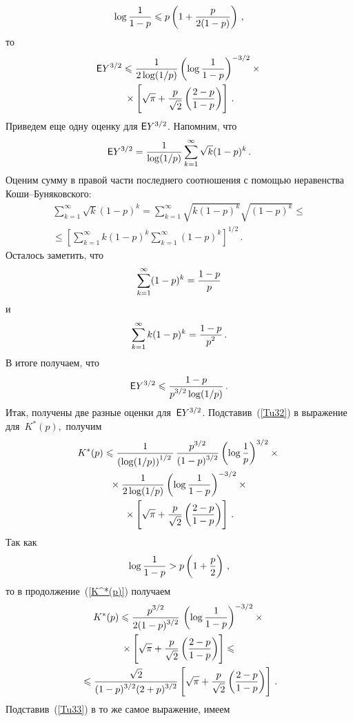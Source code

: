 \begin{multicols}{2}
\noindent
$$
\log\displaystyle\frac{\displaystyle 1\mathstrut}{\displaystyle 1-p\mathstrut} \leqslant  p\left(1+\displaystyle\frac{\displaystyle p\mathstrut}{\displaystyle 2(1-p)\mathstrut}\right)\,,
$$
то
\begin{multline}
 \e Y^{3/2} \leqslant
\fr{1}{2\log({1}/{p})}\left(\log\fr{1}{1-p}\right)^{-3/2}\times{}\\
{}\times
\left[\sqrt{\pi}+\fr{p}{\sqrt{2}}
\left(\fr{2-p}{1-p}\right)\right]\,.
\label{Tu32}
\end{multline}
Приведем еще одну оценку для ${\sf E} Y^{3/2}$. Напомним, что
$$
{\sf E} Y^{3/2}=\displaystyle\frac{\displaystyle 1\mathstrut}{\displaystyle \log({1}/{p})\mathstrut}\sum\limits_{k=1}^\infty \sqrt{k}
(1-p)^k\,.
$$
Оценим сумму в правой части последнего соотношения с помощью
неравенства Коши--Бу\-ня\-ков\-ского:
\begin{multline*}
\sum\limits_{k=1}^\infty \sqrt{k} (1-p)^k =
\sum\limits_{k=1}^\infty \sqrt{k(1-p)^k} \sqrt{(1-p)^k} \leqslant{}\\
{}\leqslant
\left[\sum\limits_{k=1}^\infty k (1-p)^k \sum\limits_{k=1}^\infty
(1-p)^k\right]^{1/2}\,.
\end{multline*}
Осталось заметить, что
$$
\sum\limits_{k=1}^\infty (1-p)^k = \displaystyle\frac{\displaystyle 1-p\mathstrut}{\displaystyle p\mathstrut}
$$
и
$$
\sum\limits_{k=1}^\infty k (1-p)^k = \displaystyle\frac{\displaystyle 1-p\mathstrut}{\displaystyle p^2\mathstrut}\,.
$$
В итоге получаем, что
\begin{equation}
 \e Y^{3/2}\leqslant \fr{1-p}{p^{3/2}\log(1/p)}\,.
 \label{Tu33}
\end{equation}
Итак, получены две разные оценки для~${\sf E} Y^{3/2}$. Подставив~(\ref{Tu32}) в выражение для~$K^*(p),$ получим
\begin{multline}
K^*(p) \leqslant  \fr{1}{\left(\log(1/p)\right)^{1/2}} \,
\fr{p^{3/2}}{(1-p)^{3/2}}\left(\log\fr{1}{p}\right)^{3/2} \times{}
\\
{}
\times\fr{1}{2\log({1}/{p})}
\left(\log\fr{1}{1-p}\right)^{-3/2}\times{}\\
{}\times \left[\sqrt{\pi}+\fr{p}{\sqrt{2}}\left(\fr{2-p}{1-p}\right)\right]\,.
\label{K^*(p)}
\end{multline}
Так как
$$
\log{\displaystyle\frac{\displaystyle 1\mathstrut}{\displaystyle 1-p\mathstrut}} > p\left(1+\displaystyle\frac{\displaystyle p\mathstrut}{\displaystyle 2\mathstrut}\right)\,,
$$
то в продолжение~(\ref{K^*(p)}) получаем
\begin{multline}
K^*(p)\leqslant \fr{p^{3/2}}{2(1-p)^{3/2}} \,
\left(\log\fr{1}{1-p}\right)^{-3/2}\times{}\\
{}\times
\left[
\sqrt{\pi}+\fr{p}{\sqrt{2}}\left(\fr{2-p}{1-p}\right)\right]
\leqslant{}
\\
\!{}\leqslant
\fr{\sqrt{2}}{(1-p)^{3/2}(2+p)^{3/2}}
\left[\sqrt{\pi}+\fr{p}{\sqrt{2}}\left(\fr{2-p}{1-p}\right)\right]\,.\!
\label{Tu34}
\end{multline}
Подставив~(\ref{Tu33}) в то же самое выражение, имеем

\end{multicols}
